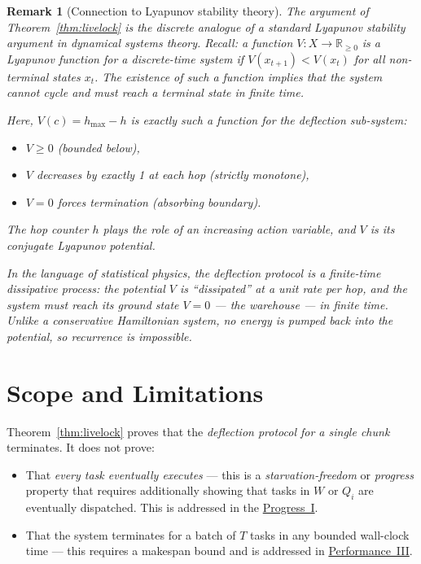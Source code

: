 \documentclass[11pt,a4paper]{report}
\newtheorem{remark}{Remark}[section]
\begin{document}
\begin{remark}[Connection to Lyapunov stability theory]
The argument of Theorem~\ref{thm:livelock} is the discrete analogue
of a standard Lyapunov stability argument in dynamical systems
theory.  Recall: a function $V : X \to \mathbb{R}_{\geq 0}$ is a
\emph{Lyapunov function} for a discrete-time system if
$V(x_{t+1}) < V(x_t)$ for all non-terminal states $x_t$.
The existence of such a function implies that the system cannot
cycle and must reach a terminal state in finite time.

Here, $V(c) = h_{\max} - h$ is exactly such a function for the
deflection sub-system:
\begin{itemize}
  \item $V \geq 0$ (bounded below),
  \item $V$ decreases by exactly 1 at each hop (strictly monotone),
  \item $V = 0$ forces termination (absorbing boundary).
\end{itemize}
The hop counter $h$ plays the role of an increasing \emph{action
variable}, and $V$ is its conjugate \emph{Lyapunov potential}.

In the language of statistical physics, the deflection protocol is
a \emph{finite-time dissipative process}: the potential $V$ is
``dissipated'' at a unit rate per hop, and the system must reach its
ground state $V=0$ --- the warehouse --- in finite time.  Unlike a
conservative Hamiltonian system, no energy is pumped back into the
potential, so recurrence is impossible.
\end{remark}

\section{Scope and Limitations}

Theorem~\ref{thm:livelock} proves that the \emph{deflection protocol
for a single chunk} terminates.  It does not prove:

\begin{itemize}
  \item That \emph{every task eventually executes} --- this is a
        \emph{starvation-freedom} or \emph{progress} property that
        requires additionally showing that tasks in $W$ or $Q_i$
        are eventually dispatched.  This is addressed in the
        \hyperref[chap:bounded_wait]{Progress~I}.
  \item That the system terminates for a batch of $T$ tasks in any
        bounded wall-clock time --- this requires a makespan bound and
        is addressed in \hyperref[chap:makespan]{Performance~III}.
\end{itemize}
\end{document}
